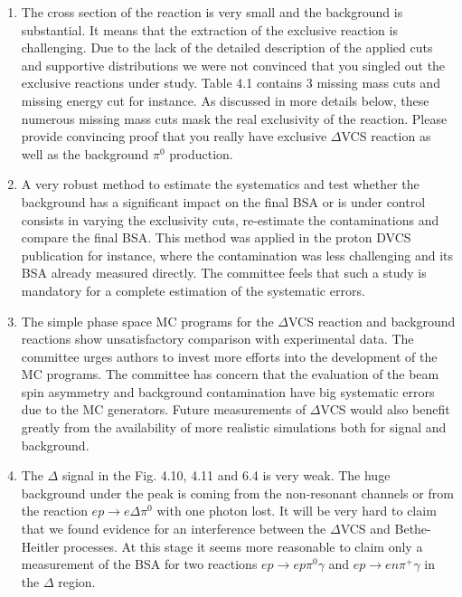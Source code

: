\documentclass[11pt]{paper}
\begin{document}
\begin{enumerate}

\item The cross section of the reaction is very small and the background is substantial. 
It means that the extraction of the exclusive reaction is challenging. 
Due to the lack of the detailed description of the applied cuts and supportive distributions we were not convinced that you singled out the exclusive reactions under study. 
Table 4.1 contains 3 missing mass cuts and missing energy cut for instance. As discussed in more details below, these numerous missing mass cuts mask the real exclusivity of the reaction. 
Please provide convincing proof that you really have exclusive $\Delta$VCS reaction as well as the background $\pi^0$ production.
 
\item A very robust method to estimate the systematics and test whether the background has a significant impact on the final BSA or is under control consists in
varying the exclusivity cuts, re-estimate the contaminations and compare the final BSA.
This method was applied in the proton DVCS publication for instance, where the contamination was less challenging and its BSA already measured directly.
The committee feels that such a study is mandatory for a complete estimation of the systematic errors.

\item The simple phase space MC programs for the $\Delta$VCS reaction and background reactions show unsatisfactory comparison with experimental data. 
The committee urges authors to invest more efforts into the development of the MC programs.  
The committee has concern that the evaluation of the beam spin asymmetry and background contamination have big systematic errors due to the MC generators. 
Future measurements of $\Delta$VCS would also benefit greatly from the availability of more realistic simulations both for signal and background.

\item The $\Delta$ signal in the Fig. 4.10, 4.11 and 6.4 is very weak.  
The huge background under the peak is coming from the non-resonant channels or from the reaction $ep\to e\Delta \pi^0$ with one photon lost. 
It will be very hard to claim that we found evidence for an interference between the $\Delta$VCS and Bethe-Heitler processes.
At this stage it seems more reasonable to claim only a measurement of the BSA for two reactions $ep\to ep\pi^0\gamma$ and $ep\to en\pi^+\gamma$ in the $\Delta$ region.


\end{enumerate}
\end{document}

